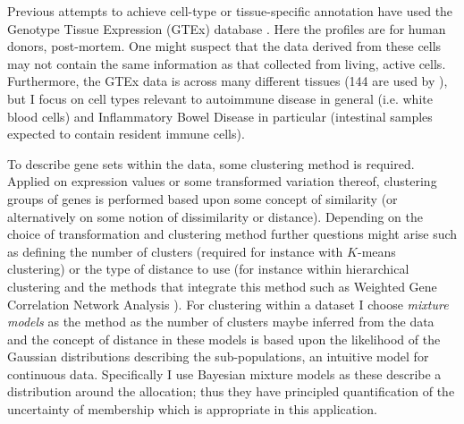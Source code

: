 \documentclass[14pt]{extarticle} %
\begin{document}
	
	Previous attempts to achieve cell-type or tissue-specific annotation have used the Genotype Tissue Expression (GTEx) \citep{GTExConsortiumGeneticeffectsgene2017} database \citep{LonsdaleGenotypeTissueExpressionGTEx2013}. Here the profiles are for human donors,
	post-mortem. One might suspect that the data derived from these cells may not contain the same information as that collected from living, active cells. Furthermore, the GTEx data is across many different tissues (144 are used by \citet{LonsdaleGenotypeTissueExpressionGTEx2013}), but I focus on cell types relevant to autoimmune disease in general (i.e. white blood cells) and Inflammatory Bowel Disease in particular (intestinal samples expected to contain resident immune cells).
	
	To describe gene sets within the data, some clustering method is required. Applied on expression values or some transformed variation thereof, clustering groups of genes is performed based upon some concept of similarity (or alternatively on some notion of dissimilarity or distance). Depending on the choice of transformation and clustering method further questions might arise such as defining the number of clusters (required for instance with $K$-means clustering) or the type of distance to use (for instance within hierarchical clustering and the methods that integrate this method such as Weighted Gene Correlation Network Analysis \citep{zhang2005general}). For clustering within a dataset I choose \emph{mixture models} as the method as the number of clusters maybe inferred from the data and the concept of distance in these models is based upon the likelihood of the Gaussian distributions describing the sub-populations, an intuitive model for continuous data. Specifically I use Bayesian mixture models as these describe a distribution around the allocation; thus they have principled quantification of the uncertainty of membership which is appropriate in this application. 
	
\end{document}
